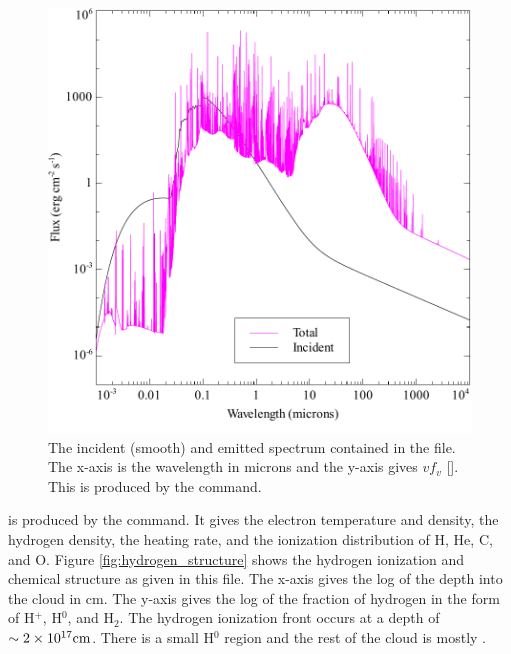 \documentclass[12pt,twoside]{article}
\begin{document}
\begin{figure}
\begin{center}
\includegraphics[clip=on,width=0.8\columnwidth,height=0.8\textheight,keepaspectratio]{orion_hii_pdr_pp_con}
\end{center}
\caption{The incident (smooth) and emitted spectrum contained in the
 file.  The
x-axis is the wavelength in microns and
the y-axis gives $vf_v$ [\ergpscmps ].  This is produced by the
 command.}
\label{fig:orion_hii_pdr_pp_con}
\end{figure}

 is produced
by the  command.  It gives
the electron temperature and density, the hydrogen density, the heating
rate, and the ionization distribution of H, He, C, and O.
Figure \ref{fig:hydrogen_structure} shows the hydrogen ionization
and chemical structure as given in this file.
The x-axis gives the log of the depth into the cloud in cm.
The y-axis gives the log of the fraction of hydrogen in the form of H$^+$,
H$^0$, and H$_2$.
The hydrogen ionization
front occurs at a depth of $\sim 2 \times 10^{17} \rm{cm}$.
There is a small H$^0$ region and the rest of the cloud is mostly \htwo .
\end{document}
